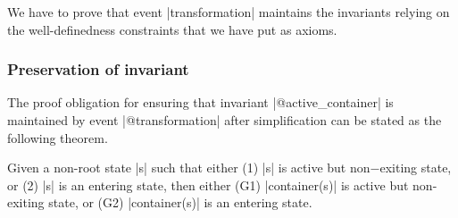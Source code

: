 We have to prove that event |transformation| maintains the  invariants relying on the well-definedness constraints that we have put as axioms.


\subsubsection{Preservation of invariant }
The proof obligation for ensuring that invariant |@active_container| is maintained by event |@transformation| after simplification can be stated as the following theorem.
\begin{theorem}
\label{po:transformation/active_container/INV}
Given a non-root state |s| such that either (1) |s| is active but non−exiting state, or (2) |s| is an entering state, then either (G1) |container(s)| is active but non-exiting state, or (G2) |container(s)| is an entering state.
\end{theorem}
